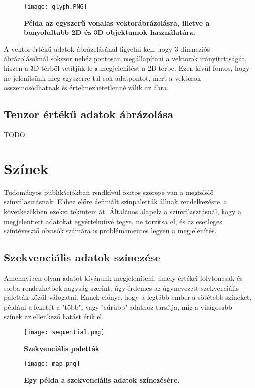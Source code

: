\documentclass[12pt]{extarticle}
\begin{document}
 \begin{figure}[H]
    \centering
    \texttt{[image: glyph.PNG]}
    \caption{\textbf{Példa az egyszerű vonalas vektorábrázolásra, illetve a bonyolultabb 2D és 3D objektumok használatára.}}
    \label{fig:GeneralDiagram}
 \end{figure}
 
 A vektor értékű adatok ábrázolásánál figyelni kell, hogy 3 dimneziós ábrázolásoknál sokszor nehéz pontosan megállapítani a vektorok irányítottságát, hiszen a 3D térből vetítjük le a megjelenítést a 2D térbe. Ezen kívül fontos, hogy ne jelenítsünk meg egyszerre túl sok adatpontot, mert a vektorok összemosódhatnak és értelmezhetetlenné válik az ábra. 
 
  \subsection{Tenzor értékű adatok ábrázolása}
 TODO
 \section{Színek}
 Tudományos publikációkban rendkívül fontos szerepe van a megfelelő színválasztásnak. Ehhez előre definiált színpaletták állnak rendelkezésre, a következőkben ezeket tekintem át. Általános alapelv a színválasztásnál, hogy a megjelenített adatokat egyértelművé tegye, ne torzítsa el, és az esetleges színtévesztő olvasók számára is problémamentes legyen a megjelenítés.
 
 \subsection{Szekvenciális adatok színezése}
 
 Amennyiben olyan adatot kívánunk megjeleníteni, amely értékei folytonosak és sorba rendezhetőek nagyság szerint, úgy érdemes az úgynevezett szekvenciális paletták közül válogatni. Ennek előnye, hogy a legtöbb ember a sötétebb színeket, például a feketét a "több", vagy "sűrűbb" adathoz társítja, míg a világosabb színek az ellenkező hatást érik el. 
 
 \begin{figure}[H]
    \centering
    \texttt{[image: sequential.png]}
    \caption{\textbf{Szekvenciális paletták}}
    \label{fig:GeneralDiagram}
 \end{figure}
 
  \begin{figure}[H]
    \centering
    \texttt{[image: map.png]}
    \caption{\textbf{Egy példa a szekvenciális adatok színezésére.}}
    \label{fig:GeneralDiagram}
 \end{figure}
\end{document}
